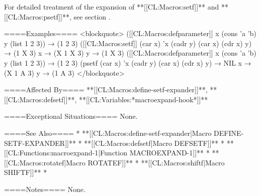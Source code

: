 For detailed treatment of the expansion of **[[CL:Macros:setf]]** and **[[CL:Macros:psetf]]**, see section {\secref\KindsOfPlaces}.

====Examples====
<blockquote> ([[CL:Macros:defparameter]] x (cons 'a 'b) y (list 1 2 3)) → (1 2 3) ([[CL:Macros:setf]] (car x) 'x (cadr y) (car x) (cdr x) y) → (1 X 3) x → (X 1 X 3) y → (1 X 3) ([[CL:Macros:defparameter]] x (cons 'a 'b) y (list 1 2 3)) → (1 2 3) (psetf (car x) 'x (cadr y) (car x) (cdr x) y) → NIL x → (X 1 A 3) y → (1 A 3) </blockquote>

====Affected By====
**[[CL:Macros:define-setf-expander]]**, **[[CL:Macros:defsetf]]**, **[[CL:Variables:*macroexpand-hook*]]**

====Exceptional Situations====
None.

====See Also====
  * **[[CL:Macros:define-setf-expander|Macro DEFINE-SETF-EXPANDER]]**
  * **[[CL:Macros:defsetf|Macro DEFSETF]]**
  * **[[CL:Functions:macroexpand-1|Function MACROEXPAND-1]]**
  * **[[CL:Macros:rotatef|Macro ROTATEF]]**
  * **[[CL:Macros:shiftf|Macro SHIFTF]]**
  * {\secref\GeneralizedReference}

====Notes====
None.

 

